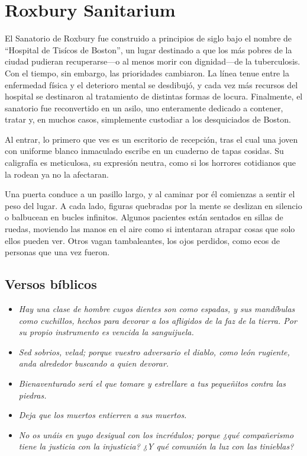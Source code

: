 \section{Roxbury Sanitarium}

El Sanatorio de Roxbury fue construido a principios de siglo bajo el nombre de
“Hospital de Tisícos de Boston”, un lugar destinado a que los más pobres de la
ciudad pudieran recuperarse—o al menos morir con dignidad—de la tuberculosis.
Con el tiempo, sin embargo, las prioridades cambiaron. La línea tenue entre la
enfermedad física y el deterioro mental se desdibujó, y cada vez más recursos
del hospital se destinaron al tratamiento de distintas formas de locura.
Finalmente, el sanatorio fue reconvertido en un asilo, uno enteramente dedicado
a contener, tratar y, en muchos casos, simplemente custodiar a los desquiciados
de Boston.

Al entrar, lo primero que ves es un escritorio de recepción, tras el cual una
joven con uniforme blanco inmaculado escribe en un cuaderno de tapas cosidas.
Su caligrafía es meticulosa, su expresión neutra, como si los horrores
cotidianos que la rodean ya no la afectaran.

Una puerta conduce a un pasillo largo, y al caminar por él comienzas a sentir
el peso del lugar. A cada lado, figuras quebradas por la mente se deslizan en
silencio o balbucean en bucles infinitos. Algunos pacientes están sentados en
sillas de ruedas, moviendo las manos en el aire como si intentaran atrapar
cosas que solo ellos pueden ver. Otros vagan tambaleantes, los ojos perdidos,
como ecos de personas que una vez fueron.

\subsection{Versos bíblicos}

\begin{itemize}

    \item \emph{Hay una clase de hombre cuyos dientes son como espadas, y sus
    mandíbulas como cuchillos, hechos para devorar a los afligidos de la faz de
    la tierra. Por su propio instrumento es vencida la sanguijuela.}

    \item \emph{Sed sobrios, velad; porque vuestro adversario el diablo, como
    león rugiente, anda alrededor buscando a quien devorar.}

    \item \emph{Bienaventurado será el que tomare y estrellare a tus pequeñitos
    contra las piedras.}

    \item \emph{Deja que los muertos entierren a sus muertos.}

    \item \emph{No os unáis en yugo desigual con los incrédulos; porque ¿qué
    compañerismo tiene la justicia con la injusticia? ¿Y qué comunión la luz
    con las tinieblas?}

\end{itemize}